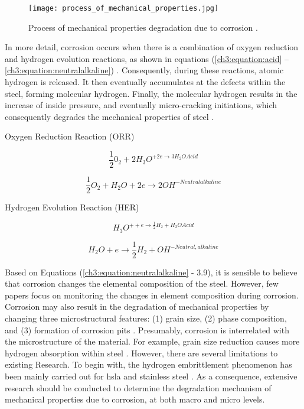 \begin{figure}[H]
    \centering
    \texttt{[image: process\_of\_mechanical\_properties.jpg]}
    \caption{Process of mechanical properties degradation due to corrosion \cite{protopopoff2011surface}.}
    \label{ch3:figure:degradation}
\end{figure}

In more detail, corrosion occurs when there is a combination of oxygen reduction and hydrogen evolution reactions, as shown in equations (\ref{ch3:equation:acid} – \ref{ch3:equation:neutralalkaline}) \cite{li2018effect}.  Consequently, during these reactions, atomic hydrogen is released. It then eventually accumulates at the defects within the steel, forming molecular hydrogen. Finally, the molecular hydrogen results in the increase of inside pressure, and eventually micro-cracking initiations, which consequently degrades the mechanical properties of steel \cite{whitman1924effect}.

\begin{center}
    Oxygen Reduction Reaction (ORR)
\end{center}

\begin{equation}
    \frac{1}{2}0_2 + 2H_3O^{+2e \rightarrow 3H_2OAcid}
    \label{ch3:equation:acid}
\end{equation}

\begin{equation}
    \frac{1}{2}O_2 + H_2O + 2e \rightarrow 2OH^{-Neutralalkaline}
\end{equation}

\begin{center}
    Hydrogen Evolution Reaction (HER)
\end{center}

\begin{equation}
    H_3O^{++e \rightarrow \frac{1}{2}H_2 + H_2OAcid}
\end{equation}

\begin{equation}
    H_2O + e \rightarrow \frac{1}{2}H_2 + OH^{-Neutral,alkaline}
    \label{ch3:equation:neutralalkaline}
\end{equation}

Based on Equations (\ref{ch3:equation:neutralalkaline} - 3.9), it is sensible to believe that corrosion changes the elemental composition of the steel. However, few papers focus on monitoring the changes in element composition during corrosion. Corrosion may also result in the degradation of mechanical properties by changing three microstructural features: (1) grain size, (2) phase composition, and (3) formation of corrosion pits \cite{li2018effect}. Presumably, corrosion is interrelated with the microstructure of the material. For example, grain size reduction causes more hydrogen absorption within steel \cite{li2018effect}. However, there are several limitations to existing Research. To begin with, the hydrogen embrittlement phenomenon has been mainly carried out for \acrfull{hsla} and stainless steel \cite{li2018effect}. As a consequence, extensive research should be conducted to determine the degradation mechanism of mechanical properties due to corrosion, at both macro and micro levels.  

